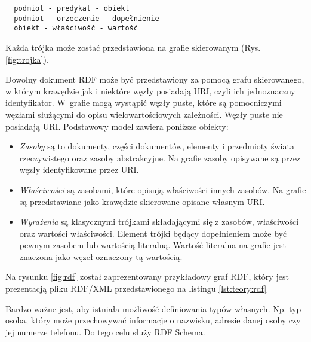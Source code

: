 \begin{verbatim}
  podmiot - predykat - obiekt  
  podmiot - orzeczenie - dopełnienie  
  obiekt - właściwość - wartość
\end{verbatim}

 Każda trójka może zostać przedstawiona na grafie skierowanym (Rys. \ref{fig:trojka}). 



Dowolny dokument RDF może być przedstawiony za pomocą grafu skierowanego, w którym krawędzie jak i niektóre węzły posiadają URI, czyli ich jednoznaczny identyfikator. 
W~grafie mogą wystąpić węzły puste, które są pomocniczymi węzłami służącymi do opisu wielowartościowych zależności. Węzły puste nie posiadają URI.
Podstawowy model zawiera poniższe obiekty\cite{jedruch}:

\begin{itemize}
 \item \textit{Zasoby} są to  dokumenty, części dokumentów, elementy i przedmioty świata rzeczywistego oraz zasoby abstrakcyjne. Na grafie zasoby opisywane
 są przez węzły identyfikowane przez URI.
\item \textit{Właściwości} są zasobami, które opisują właściwości innych zasobów. Na grafie są przedstawiane jako krawędzie skierowane opisane własnym URI. 
\item \textit{Wyrażenia} są klasycznymi trójkami składającymi się z zasobów, właściwości oraz wartości właściwości. Element trójki będący dopełnieniem może być pewnym zasobem
lub wartością literalną. Wartość literalna na grafie jest znaczona jako węzeł oznaczony tą wartością.  
\end{itemize}

Na rysunku \ref{fig:rdf} został zaprezentowany przykładowy graf RDF, który jest prezentacją pliku RDF/XML przedstawionego na listingu  \ref{lst:teory:rdf}







Bardzo ważne jest, aby istniała możliwość definiowania typów własnych. Np. typ osoba, który może przechowywać informacje o nazwisku, adresie danej osoby czy jej numerze
telefonu. Do tego celu służy RDF Schema.  

